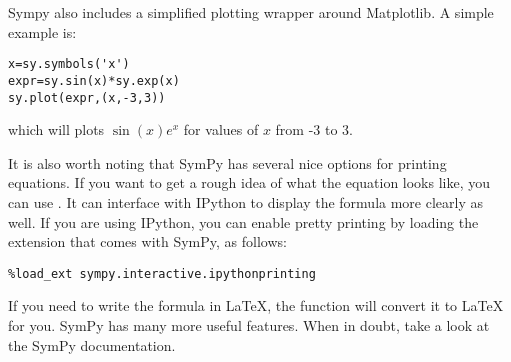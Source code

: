 Sympy also includes a simplified plotting wrapper around Matplotlib.
A simple example is:
\begin{lstlisting}
x=sy.symbols('x')
expr=sy.sin(x)*sy.exp(x)
sy.plot(expr,(x,-3,3))
\end{lstlisting}
which will plots $\sin\left(x\right) e^x$ for values of $x$ from -3 to 3.

It is also worth noting that SymPy has several nice options for printing equations.
If you want to get a rough idea of what the equation looks like, you can use .
It can interface with IPython to display the formula more clearly as well.
If you are using IPython, you can enable pretty printing by loading the extension that comes with SymPy, as follows:
\begin{lstlisting}
%load_ext sympy.interactive.ipythonprinting
\end{lstlisting}
If you need to write the formula in LaTeX, the function  will convert it to LaTeX for you.
SymPy has many more useful features.
When in doubt, take a look at the SymPy documentation.